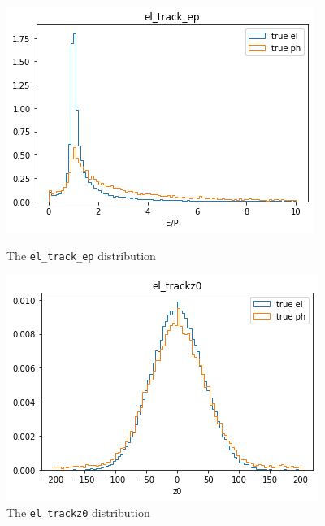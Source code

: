 \documentclass[a4paper, oneside]{book}
\begin{document}
					\begin{figure}[ht]  
						\begin{minipage}[b]{0.5\linewidth}
							\centering
							\includegraphics[width=.9\linewidth]{tesi_images/el_track_ep.png} 
							\caption{The \texttt{el\_track\_ep} distribution} 
							\label{fig: ep}
							\vspace{4ex}
						\end{minipage}%
						\begin{minipage}[b]{0.5\linewidth}
							\centering
							\includegraphics[width=.9\linewidth]{tesi_images/el_trackz0.png} 
							\caption{The \texttt{el\_trackz0} distribution}
							\label{fig: z0} 
							\vspace{4ex}
						\end{minipage} 
						\begin{minipage}[b]{0.5\linewidth}
							\centering

\end{minipage}
\end{figure}
\end{document}

